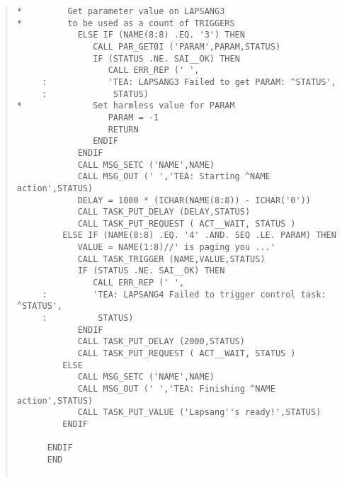 \begin{quote}
\begin{verbatim}
*         Get parameter value on LAPSANG3
*         to be used as a count of TRIGGERS
            ELSE IF (NAME(8:8) .EQ. '3') THEN
               CALL PAR_GET0I ('PARAM',PARAM,STATUS)
               IF (STATUS .NE. SAI__OK) THEN
                  CALL ERR_REP (' ',
     :            'TEA: LAPSANG3 Failed to get PARAM: ^STATUS',
     :             STATUS)
*              Set harmless value for PARAM
                  PARAM = -1
                  RETURN
               ENDIF
            ENDIF
            CALL MSG_SETC ('NAME',NAME)
            CALL MSG_OUT (' ','TEA: Starting ^NAME action',STATUS)
            DELAY = 1000 * (ICHAR(NAME(8:8)) - ICHAR('0'))
            CALL TASK_PUT_DELAY (DELAY,STATUS)
            CALL TASK_PUT_REQUEST ( ACT__WAIT, STATUS )
         ELSE IF (NAME(8:8) .EQ. '4' .AND. SEQ .LE. PARAM) THEN
            VALUE = NAME(1:8)//' is paging you ...'
            CALL TASK_TRIGGER (NAME,VALUE,STATUS)
            IF (STATUS .NE. SAI__OK) THEN
               CALL ERR_REP (' ',
     :         'TEA: LAPSANG4 Failed to trigger control task: ^STATUS',
     :          STATUS)
            ENDIF
            CALL TASK_PUT_DELAY (2000,STATUS)
            CALL TASK_PUT_REQUEST ( ACT__WAIT, STATUS )
         ELSE
            CALL MSG_SETC ('NAME',NAME)
            CALL MSG_OUT (' ','TEA: Finishing ^NAME action',STATUS)
            CALL TASK_PUT_VALUE ('Lapsang''s ready!',STATUS)
         ENDIF

      ENDIF
      END


\end{verbatim} \end{quote} \normalsize

